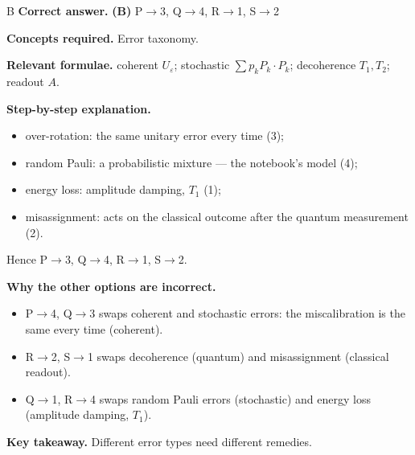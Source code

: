 \documentclass[11pt,a4paper]{article}
\newcommand{\qsep}{\par\vspace{2pt}{\color{black!15}\hrule}\vspace{4pt}}
\begin{document}
\begin{solbox}{B}
\textbf{\color{brand}Correct answer.} \textcolor{okgreen}{\textbf{(B)}} P$\to$3, Q$\to$4, R$\to$1, S$\to$2

\textbf{\color{brand}Concepts required.} Error taxonomy.

\textbf{\color{brand}Relevant formulae.} coherent $U_\varepsilon$; stochastic $\sum p_kP_k\cdot P_k$; decoherence $T_1, T_2$; readout $A$.

\textbf{\color{brand}Step-by-step explanation.} \begin{itemize}\itemsep0pt
\item over-rotation: the same unitary error every time (3);
\item random Pauli: a probabilistic mixture --- the notebook's model (4);
\item energy loss: amplitude damping, $T_1$ (1);
\item misassignment: acts on the classical outcome after the quantum measurement (2).
\end{itemize}
Hence P$\to$3, Q$\to$4, R$\to$1, S$\to$2.

\textbf{\color{brand}Why the other options are incorrect.}
\begin{itemize}[leftmargin=2.4em, itemsep=1pt, topsep=2pt]
\item[\textbf{(A)}] P$\to$4, Q$\to$3 swaps coherent and stochastic errors: the miscalibration is the same every time (coherent).
\item[\textbf{(C)}] R$\to$2, S$\to$1 swaps decoherence (quantum) and misassignment (classical readout).
\item[\textbf{(D)}] Q$\to$1, R$\to$4 swaps random Pauli errors (stochastic) and energy loss (amplitude damping, $T_1$).
\end{itemize}
\textbf{\color{brand}Key takeaway.} Different error types need different remedies.
\end{solbox}
\qsep
\end{document}
